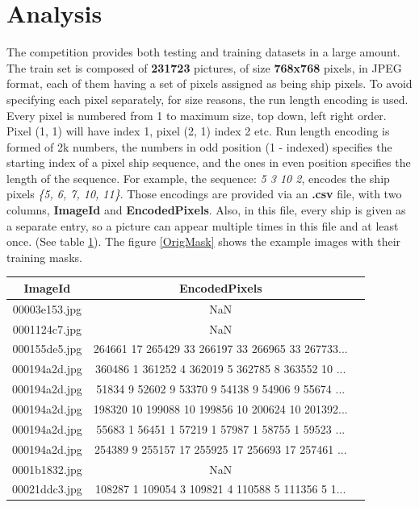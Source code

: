 \section{Analysis}
The competition provides both testing and training datasets in a large amount. The train set is composed of \textbf{231723} pictures, of size \textbf{768x768} pixels, in JPEG format, each of them having a set of pixels assigned as being ship pixels. To avoid specifying each pixel separately, for size reasons, the run length encoding is used. Every pixel is numbered from 1 to maximum size, top down, left right order. Pixel (1, 1) will have index 1, pixel (2, 1) index 2 etc. Run length encoding is formed of 2k numbers, the numbers in odd position (1 - indexed) specifies the starting index of a pixel ship sequence, and the ones in even position specifies the length of the sequence.
For example, the sequence: \textit{5 3 10 2}, encodes the ship pixels \textit{\{5, 6, 7, 10, 11\}}. Those encodings are provided via an \textbf{.csv} file, with two columns, \textbf{ImageId} and \textbf{EncodedPixels}. Also, in this file, every ship is given as a separate entry, so a picture can appear multiple times in this file and at least once. (See table \ref{traindfhead}). The figure \ref{OrigMask} shows the example images with their training masks.\\

\begin{table}[H]
	\centering
	\begin{tabular}{|c|c|l|}
		\hline
		ImageId & EncodedPixels \\ \hline
		00003e153.jpg & NaN         \\ \hline
		0001124c7.jpg & NaN         \\ \hline
		000155de5.jpg & 264661 17 265429 33 266197 33 266965 33 267733...         \\ \hline
		000194a2d.jpg & 360486 1 361252 4 362019 5 362785 8 363552 10 ...   \\ \hline
		000194a2d.jpg & 51834 9 52602 9 53370 9 54138 9 54906 9 55674 ...   \\ \hline
		000194a2d.jpg & 198320 10 199088 10 199856 10 200624 10 201392...  \\ \hline
		000194a2d.jpg & 55683 1 56451 1 57219 1 57987 1 58755 1 59523 ...  \\ \hline
		000194a2d.jpg & 254389 9 255157 17 255925 17 256693 17 257461 ...  \\ \hline
		0001b1832.jpg & NaN  \\ \hline
		00021ddc3.jpg & 108287 1 109054 3 109821 4 110588 5 111356 5 1...  \\ \hline
	\end{tabular}
	\label{traindfhead}
\end{table}

